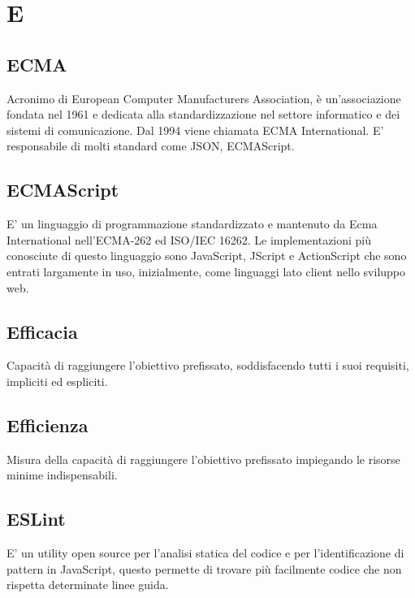 \section*{E}

\subsection{ECMA}
Acronimo di European Computer Manufacturers Association, è un'associazione fondata nel 1961 e dedicata alla standardizzazione nel settore informatico e dei sistemi di comunicazione. Dal 1994 viene chiamata ECMA International. E' responsabile di molti standard come JSON, ECMAScript.

\subsection{ECMAScript}
E' un linguaggio di programmazione standardizzato e mantenuto da Ecma International nell'ECMA-262 ed ISO/IEC 16262. Le implementazioni più conosciute di questo linguaggio sono JavaScript, JScript e ActionScript che sono entrati largamente in uso, inizialmente, come linguaggi lato client nello sviluppo web.

\subsection{Efficacia}
Capacità di raggiungere l'obiettivo prefissato, soddisfacendo tutti i suoi requisiti, impliciti ed espliciti.

\subsection{Efficienza}
Misura della capacità di raggiungere l'obiettivo prefissato impiegando le risorse minime indispensabili.

\subsection{ESLint}
E' un utility open source per l’analisi statica del codice e per l’identificazione di pattern in JavaScript,  questo permette di trovare più facilmente codice che non rispetta determinate linee guida.